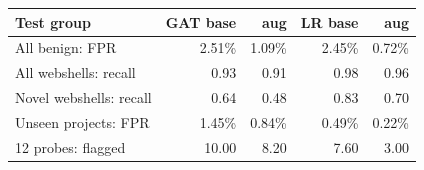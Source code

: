 \begin{tabular}{@{}lrrrr@{}}
\toprule
Test group & GAT base & aug & LR base & aug \\ \midrule
All benign: FPR & 2.51\% & 1.09\% & 2.45\% & 0.72\% \\
All webshells: recall & 0.93 & 0.91 & 0.98 & 0.96 \\
Novel webshells: recall & 0.64 & 0.48 & 0.83 & 0.70 \\
Unseen projects: FPR & 1.45\% & 0.84\% & 0.49\% & 0.22\% \\
12 probes: flagged & 10.00 & 8.20 & 7.60 & 3.00 \\
\bottomrule
\end{tabular}
